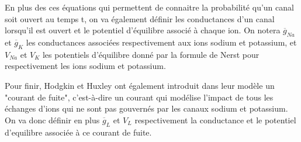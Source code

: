 \documentclass[12pt]{scrartcl}
\begin{document}
En plus des ces équations qui permettent de connaitre la probabilité qu'un canal soit ouvert au temps t, on va également définir les conductances d'un canal lorsqu'il est ouvert et le potentiel d'équilibre associé à chaque ion. On notera $\overline{g}_{Na}$ et $\overline{g}_K$ les conductances associées respectivement aux ions sodium et potassium, et $V_{Na}$ et $V_K$ les potentiels d'équilibre donné par la formule de Nerst pour respectivement les ions sodium et potassium.

Pour finir, Hodgkin et Huxley ont également introduit dans leur modèle un "courant de fuite", c'est-à-dire un courant qui modélise l'impact de tous les échanges d'ions qui ne sont pas gouvernés par les canaux sodium et potassium. On va donc définir en plus $\overline{g}_L$ et $V_L$ respectivement la conductance et le potentiel d'equilibre associée à ce courant de fuite.

\pagebreak
\end{document}
